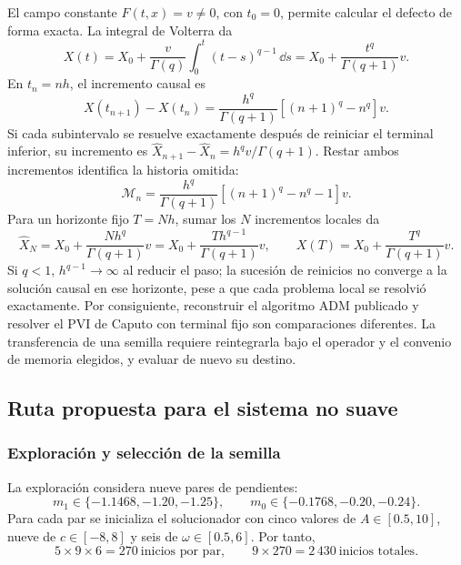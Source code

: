 El campo constante \(F(t,x)=v\ne0\), con \(t_0=0\), permite calcular el
defecto de forma exacta. La integral de Volterra da
\[
 X(t)=X_0+\frac{v}{\Gamma(q)}\int_0^t(t-s)^{q-1}\,\dd s
     =X_0+\frac{t^q}{\Gamma(q+1)}v.
\]
En \(t_n=nh\), el incremento causal es
\[
 X(t_{n+1})-X(t_n)
 =\frac{h^q}{\Gamma(q+1)}[(n+1)^q-n^q]v.
\]
Si cada subintervalo se resuelve exactamente después de reiniciar el
terminal inferior, su incremento es
\(\widehat X_{n+1}-\widehat X_n=h^qv/\Gamma(q+1)\). Restar ambos incrementos
identifica la historia omitida:
\begin{equation}
 \mathcal M_n=\frac{h^q}{\Gamma(q+1)}
               [(n+1)^q-n^q-1]v.
 \label{eq:numerical-adm-counterexample}
\end{equation}
Para un horizonte fijo \(T=Nh\), sumar los \(N\) incrementos locales da
\[
 \widehat X_N=X_0+\frac{Nh^q}{\Gamma(q+1)}v
             =X_0+\frac{Th^{q-1}}{\Gamma(q+1)}v,
 \qquad
 X(T)=X_0+\frac{T^q}{\Gamma(q+1)}v.
\]
Si \(q<1\), \(h^{q-1}\to\infty\) al reducir el paso; la sucesión de
reinicios no converge a la solución causal en ese horizonte, pese a que
cada problema local se resolvió exactamente. Por consiguiente, reconstruir
el algoritmo ADM publicado y resolver el PVI de Caputo con terminal fijo
son comparaciones diferentes. La transferencia de una semilla requiere
reintegrarla bajo el operador y el convenio de memoria elegidos, y evaluar
de nuevo su destino.

\subsection{Ruta propuesta para el sistema no suave}
\label{subsec:protocolo_no_suave}

\subsubsection{Exploración y selección de la semilla}

La exploración considera nueve pares de pendientes:
\begin{equation}
m_1\in\{-1.1468,-1.20,-1.25\},\qquad
m_0\in\{-0.1768,-0.20,-0.24\}.
\label{eq:malla_pendientes_no_suave}
\end{equation}
Para cada par se inicializa el solucionador con cinco valores de
\(A\in[0.5,10]\), nueve de \(c\in[-8,8]\) y seis de
\(\omega\in[0.5,6]\). Por tanto,
\begin{equation}
5\times9\times6=270\ \text{inicios por par},\qquad
9\times270=2\,430\ \text{inicios totales}.
\label{eq:conteo_busqueda_no_suave}
\end{equation}

